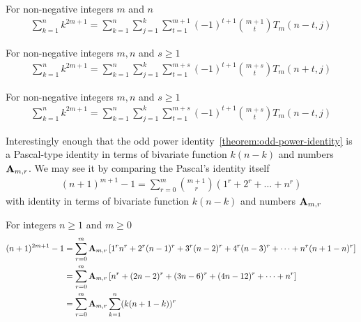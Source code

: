 \begin{proposition}
    \label{prop:sums-of-odd-power-decomposition-backward}
    For non-negative integers $m$ and $n$
    \begin{align*}
        \sum_{k=1}^{n} k^{2m+1} = \sum_{k=1}^{n} \sum_{j=1}^{k} \sum_{t=1}^{m+1} (-1)^{t+1} \binom{m+1}{t} T_{m} (n-t, j)
    \end{align*}
\end{proposition}

\begin{proposition}
    \label{prop:sums-of-odd-power-decomposition-forward-multifold}
    For non-negative integers $m,n$ and $s\geq 1$
    \begin{align*}
        \sum_{k=1}^{n} k^{2m+1} = \sum_{k=1}^{n} \sum_{j=1}^{k} \sum_{t=1}^{m+s} (-1)^{t+1} \binom{m+s}{t} T_{m} (n+t, j)
    \end{align*}
\end{proposition}

\begin{proposition}
    \label{prop:sums-of-odd-power-decomposition-backward-multifold}
    For non-negative integers $m,n$ and $s\geq 1$
    \begin{align*}
        \sum_{k=1}^{n} k^{2m+1} = \sum_{k=1}^{n} \sum_{j=1}^{k} \sum_{t=1}^{m+s} (-1)^{t+1} \binom{m+s}{t} T_{m} (n-t, j)
    \end{align*}
\end{proposition}

Interestingly enough that the odd power identity~\eqref{theorem:odd-power-identity} is a Pascal-type identity
in terms of bivariate function $k(n-k)$ and numbers ${\mathbf{A}} \sb{m,r}$.
We may see it by comparing the Pascal's identity itself~\cite{macmillan2011proofs}
\begin{align*}
(n+1)
    ^{m+1}-1 = \sum_{r=0}^{m} \binom{m+1}{r} \left( 1^{r}+2^{r} + \dots + n^{r} \right)
\end{align*}
with identity in terms of bivariate function $k(n-k)$ and numbers ${\mathbf{A}} \sb{m,r}$
\begin{corollary}
    \label{cor:bibariate-pascals-identity}
    For integers $n \geq 1$ and $m\geq 0$
    \begin{align*}
    (n+1)
        ^{2m+1} - 1
        &= \sum_{r=0}^{m} {\mathbf{A}} \sb{m,r} \left[ 1^r n^r + 2^r (n-1)^r + 3^r (n-2)^r + 4^r (n-3)^r + \cdots + n^r (n+1-n)^r  \right] \\
        &= \sum_{r=0}^{m} {\mathbf{A}} \sb{m,r} \left[ n^r + (2n-2)^r + (3n-6)^r + (4n-12)^r + \cdots + n^r  \right] \\
        &= \sum_{r=0}^{m} {\mathbf{A}} \sb{m,r} \sum_{k=1}^{n} (k (n+1-k))^r
    \end{align*}
\end{corollary}
